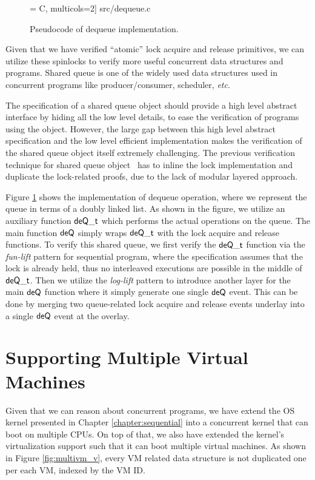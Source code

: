 \begin{figure}[t]
 = C, multicols=2] {src/dequeue.c}
\caption{Pseudocode of dequeue implementation.}
\label{fig:exp:dequeue}
\end{figure}

Given that we have verified ``atomic'' lock acquire and release primitives,
we can utilize these spinlocks to verify more useful concurrent
data structures and programs. Shared queue is one of the widely used
data structures used in concurrent programs like producer/consumer,
scheduler, {\it etc}. 

The specification of a shared queue object should provide a high level abstract
interface by hiding all the low level details,
to ease the verification of programs using the object.
However, the large gap between this high level abstract specification
and the low level efficient implementation makes the verification of the shared queue object
itself extremely challenging.
The previous verification technique for shared queue object~\cite{lili16}
has to inline the lock implementation and duplicate the lock-related proofs, due
to the lack of modular layered approach.

Figure \ref{fig:exp:dequeue} shows the implementation of dequeue operation, where
we represent the queue in terms of a doubly linked list. 
As shown in the figure, we utilize an auxiliary function $\mathsf{deQ}\mathsf{\textcolor{black}{\_t}}$ which
performs the actual operations on the queue. The main function $\mathsf{deQ}$ simply
wraps $\mathsf{deQ}\mathsf{\textcolor{black}{\_t}}$ with the lock acquire and release functions.
To verify this shared queue, we first verify the $\mathsf{deQ}\mathsf{\textcolor{black}{\_t}}$ function
via the  \emph{fun-lift} pattern for sequential program, where the specification
assumes that the lock is already held, thus no interleaved executions are possible
in the middle of $\mathsf{deQ}\mathsf{\textcolor{black}{\_t}}$. Then we utilize 
the \emph{log-lift} pattern to introduce another layer for the main $\mathsf{deQ}$ function
where it simply generate one single $\mathsf{deQ}$ event. This can be done by merging two
queue-related lock acquire and release events underlay into a single $\mathsf{deQ}$ event
at the overlay. 


\section{Supporting Multiple Virtual Machines}

Given that we can reason about concurrent programs, we have extend the OS kernel
presented in Chapter \ref{chapter:sequential} into a concurrent kernel that can boot on
multiple CPUs.  On top of that, we also have extended the kernel's virtualization support
such that it can boot multiple virtual machines.
As shown in Figure \ref{fig:multivm_v}, every VM related data structure is not duplicated
one per each VM, indexed by the VM ID.

